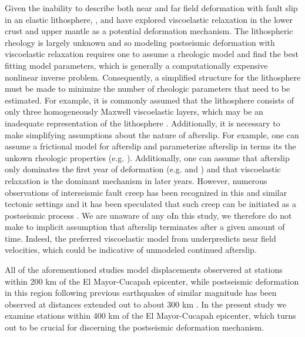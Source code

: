 \documentclass[12pt]{article}
\begin{document}
Given the inability to describe both near and far field deformation with fault slip in an elastic lithosphere, \cite{Pollitz2012}, \cite{Rollins2015} and \cite{Spinler2015} have explored viscoelastic relaxation in the lower crust and upper mantle as a potential deformation mechanism. The lithospheric rheology is largely unknown and so modeling postseismic deformation with viscoelastic relaxation requires one to assume a rheologic model and find the best fitting model parameters, which is generally a computationally expensive nonlinear inverse problem. Consequently, a simplified structure for the lithosphere must be made to minimize the number of rheologic parameters that need to be estimated.  For example, it is commonly assumed that the lithosphere consists of only three homogeneously Maxwell viscoelastic layers, which may be an inadequate representation of the lithosphere \cite{Hines2013}\cite{Riva2009}. Additionally, it is necessary to make simplifying assumptions about the nature of afterslip. For example, one can assume a frictional model for afterslip and parameterize afterslip in terms its the unkown rheologic properties (e.g. \cite{Johnson2009} \cite{Johnson2004}). Additionally, one can assume that afterslip only dominates the first year of deformation (e.g. \cite{Pollitz2012} and \cite{Spinler2015}) and that viscoelastic relaxation is the dominant mechanism in later years. However, numerous observations of interseismic fault creep has been recognized in this and similar tectonic settings and it has been speculated that such creep can be initiated as a postseismic process \cite{Cakir2012} \cite{Cetin2014}.  We are unaware of any oIn this study, we therefore do not make to implicit assumption that afterslip terminates after a given amount of time.  Indeed, the preferred viscoelastic model from \cite{Pollitz2012} underpredicts near field velocities, which could be indicative of unmodeled continued afterslip.

All of the aforementioned studies model displacements observered at stations within 200 km of the El Mayor-Cucapah epicenter, while postseismic deformation in this region following previous earthquakes of similar magnitude has been observed at distances extended out to about 300 km \cite{Freed2007a}. In the present study we examine stations within 400 km of the El Mayor-Cucapah epicenter, which turns out to be crucial for discerning the postseismic deformation mechanism.
\end{document}
